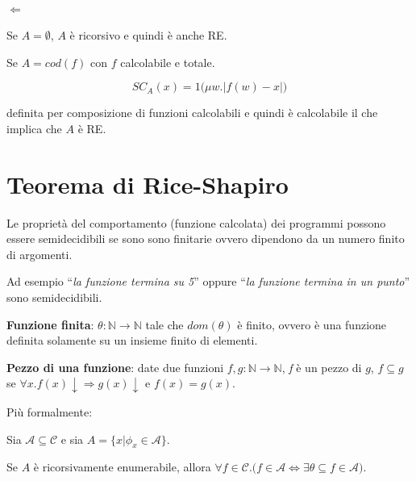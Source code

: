 \paragraph{$\Leftarrow$}

Se $A = \emptyset$, $A$ è ricorsivo e quindi è anche RE.

Se $A = cod(f)$ con $f$ calcolabile e totale.

$$
SC_A(x) = 1 \big( \mu w. |f(w) - x| \big)
$$

definita per composizione di funzioni calcolabili e quindi è calcolabile il che implica che $A$ è RE.

\section{Teorema di Rice-Shapiro}

Le proprietà del comportamento (funzione calcolata) dei programmi possono essere semidecidibili se sono sono finitarie ovvero dipendono da un numero finito di argomenti.

Ad esempio ``\textit{la funzione termina su 5}'' oppure ``\textit{la funzione termina in un punto}'' sono semidecidibili.

\textbf{Funzione finita}: $\theta : \mathbb{N}  \rightarrow \mathbb{N}$ tale che $dom(\theta)$ è finito, ovvero è una funzione definita solamente su un insieme finito di elementi.

\textbf{Pezzo di una funzione}: date due funzioni $f,g : \mathbb{N} \rightarrow \mathbb{N}$, \textit{f} è un pezzo di $g$, $f \subseteq g$ se $\forall x . f(x) \downarrow \Rightarrow g(x) \downarrow \text{ e } f(x) = g(x) $.

Più formalmente:

Sia $\mathcal{A} \subseteq \mathcal{C}$ e sia $A = \{ x | \phi_x \in \mathcal{A} \}$.

Se $ A $ è ricorsivamente enumerabile, allora $\forall f \in \mathcal{C} . \Big( f \in \mathcal{A} \Leftrightarrow \exists \theta \subseteq f \in \mathcal{A} \Big)$.

